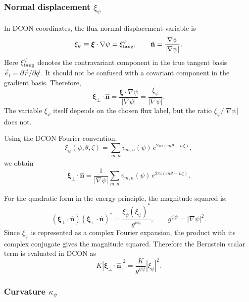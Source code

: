 \documentclass[10pt,a4paper]{article}
\numberwithin{equation}{section}
\begin{document}
\subsubsection{Normal displacement $\xi_\psi$}

In DCON coordinates, the flux-normal displacement variable is
\begin{equation}
\xi_\psi
\equiv
\boldsymbol{\xi}\cdot\nabla\psi
=
\xi^\psi_{\rm tang},
\qquad
\hat{\mathbf n}
=
\frac{\nabla\psi}{|\nabla\psi|}.
\end{equation}
Here \(\xi^\psi_{\rm tang}\) denotes the contravariant component in the true
tangent basis \(\vec e_i=\partial\vec r/\partial q^i\).  It should not be
confused with a covariant component in the gradient basis.
Therefore,
\begin{equation}
\boxed{
\boldsymbol{\xi}_\perp\cdot\hat{\mathbf n}
=
\frac{\boldsymbol{\xi}\cdot\nabla\psi}{|\nabla\psi|}
=
\frac{\xi_\psi}{|\nabla\psi|}.
}
\end{equation}
The variable $\xi_\psi$ itself depends on the chosen flux label, but the ratio
$\xi_\psi/|\nabla\psi|$ does not.

Using the DCON Fourier convention,
\begin{equation}
\xi_\psi(\psi,\theta,\zeta)
=
\sum_{m,n}
v_{m,n}(\psi)\,
e^{2\pi i(m\theta-n\zeta)},
\end{equation}
we obtain
\begin{equation}
\boxed{
\boldsymbol{\xi}_\perp\cdot\hat{\mathbf n}
=
\frac{1}{|\nabla\psi|}
\sum_{m,n}
v_{m,n}(\psi)\,
e^{2\pi i(m\theta-n\zeta)}.
}
\end{equation}

For the quadratic form in the energy principle, the magnitude squared is:
\begin{equation}
\boxed{
(\boldsymbol{\xi}_\perp\cdot\hat{\mathbf n})
(\boldsymbol{\xi}_\perp\cdot\hat{\mathbf n})^*
=
\frac{\xi_\psi(\xi_\psi)^*}{g^{\psi\psi}},
\qquad
g^{\psi\psi}=|\nabla\psi|^2.
}
\end{equation}
Since $\xi_\psi$ is represented as a complex Fourier expansion, the product with its
complex conjugate gives the magnitude squared.  Therefore the Bernstein scalar term is
evaluated in DCON as
\begin{equation}
\boxed{
K\left|\boldsymbol{\xi}_\perp\cdot\hat{\mathbf n}\right|^2
=
\frac{K}{g^{\psi\psi}}|\xi_\psi|^2.
}
\end{equation}

\subsubsection{Curvature $\kappa_\psi$}
\end{document}
